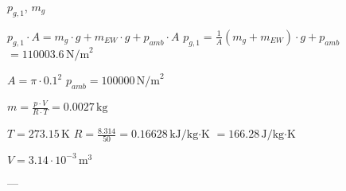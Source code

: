 \( p_{g,1} \), \( m_g \)  

\( p_{g,1} \cdot A = m_g \cdot g + m_{EW} \cdot g + p_{amb} \cdot A \)  
\( p_{g,1} = \frac{1}{A} (m_g + m_{EW}) \cdot g + p_{amb} \)  
\( = 110003.6 \, \text{N/m}^2 \)  

\( A = \pi \cdot 0.1^2 \)  
\( p_{amb} = 100000 \, \text{N/m}^2 \)  

\( m = \frac{p \cdot V}{R \cdot T} = 0.0027 \, \text{kg} \)  

\( T = 273.15 \, \text{K} \)  
\( R = \frac{8.314}{50} = 0.16628 \, \text{kJ/kg·K} \)  
\( = 166.28 \, \text{J/kg·K} \)  

\( V = 3.14 \cdot 10^{-3} \, \text{m}^3 \)  

---